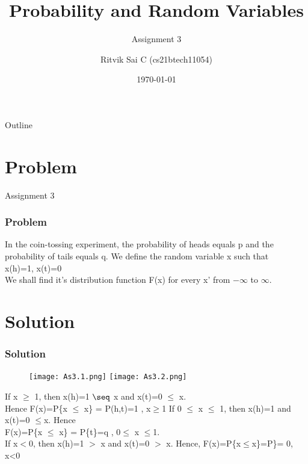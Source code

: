 \documentclass{beamer}
\title{Probability and Random Variables}
\subtitle{Assignment 3}
\author{Ritvik Sai C (cs21btech11054)}
\date{\today}
\begin{document}
\begin{frame}
    \titlepage 
\end{frame}

\begin{frame}{Outline}
    \tableofcontents
\end{frame}

\section{Problem}

\begin{frame}{Assignment 3}
  \frametitle{Problem}
 In the coin-tossing experiment, the probability of heads equals p and the probability of tails equals q. We define the random variable x such that\\
x(h)=1, x(t)=0\\
We shall find it's distribution function F(x) for every x' from $-\infty$ to $\infty$.\\

 \end{frame}
  
\section{Solution}
\begin{frame}
\frametitle{Solution}
\begin{figure}[h]
    \texttt{[image: As3.1.png]}
     \texttt{[image: As3.2.png]}
\end{figure}
If x $\geq$ 1, then x(h)=1 $\seq$ x and x(t)=0 $\leq$ x.\\
Hence F(x)=P\{x $\leq$ x\} = P(h,t)=1 , x$\geq$1
If 0 $\leq$ x $\leq$ 1, then x(h)=1 and x(t)=0 $\leq$x. Hence\\
F(x)=P\{x $\leq$ x\} = P\{t\}=q , 0$\leq$ x $\leq$1.\\
If x$<$0, then x(h)=1 $>$ x and x(t)=0 $>$ x. Hence,
F(x)=P\{x$\leq$x\}=P\theta\}= 0, x<0
\end{frame}
\end{document}
